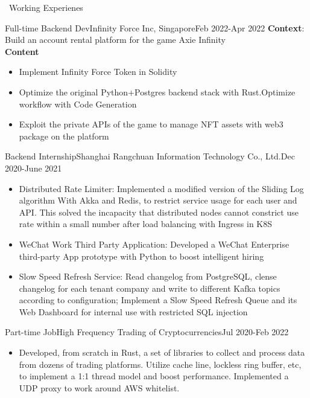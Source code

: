 \documentclass{resume}
\begin{document}
\begin{rSection}{\faUsers~Working Experienes}
    \begin{rExperience}{Full-time Backend Dev}{Infinity Force Inc, Singapore}{Feb 2022-Apr 2022}
        \textbf{Context}:
        Build an account rental platform for the game Axie Infinity\\
        \textbf{Content}
        \begin{itemize}
            \itemsep -0.5em \vspace{-0.5em}
            \item Implement Infinity Force Token in Solidity
            \item Optimize the original Python+Postgres backend stack with Rust.Optimize workflow with Code Generation
            \item Exploit the private APIs of the game to manage NFT assets with web3 package on the platform
        \end{itemize}
    \end{rExperience}
    \begin{rExperience}{Backend Internship}{Shanghai Rangchuan Information Technology Co., Ltd.}{Dec 2020-June 2021}
        \begin{itemize}
            \itemsep -0.5em \vspace{-0.5em}
            \item Distributed Rate Limiter: Implemented  a modified version of the Sliding Log algorithm With Akka and Redis, to restrict service usage for each user and API. This solved the incapacity that distributed nodes cannot constrict use rate within a small number after load balancing with Ingress in K8S
            \item WeChat Work Third Party Application: Developed a WeChat Enterprise third-party App prototype with Python to boost intelligent hiring
            \item Slow Speed Refresh Service: Read changelog from PostgreSQL, clense changelog for each tenant company and write to different Kafka topics according to configuration; Implement a Slow Speed Refresh Queue and its Web Dashboard for internal use with restricted SQL injection       
        \end{itemize}
    \end{rExperience}
    \begin{rExperience}{Part-time Job}{High Frequency Trading of Cryptocurrencies}{Jul 2020-Feb 2022}
        \begin{itemize}
            \itemsep -0.5em \vspace{-0.5em}
            \item Developed, from scratch in Rust, a set of libraries to collect and process data from dozens of trading platforms. Utilize cache line, lockless ring buffer, etc, to implement a 1:1 thread model and boost performance. Implemented a UDP proxy to work around AWS whitelist.

\end{itemize}
\end{rExperience}
\end{rSection}
\end{document}
